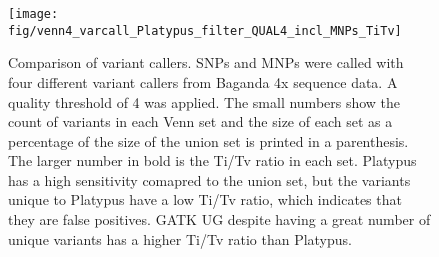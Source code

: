 \begin{figure}
\centering
\texttt{[image: fig/venn4\_varcall\_Platypus\_filter\_QUAL4\_incl\_MNPs\_TiTv]}
\caption{Comparison of variant callers. SNPs and MNPs were called with four different variant callers from Baganda 4x sequence data. A quality threshold of 4 was applied. The small numbers show the count of variants in each Venn set and the size of each set as a percentage of the size of the union set is printed in a parenthesis. The larger number in bold is the Ti/Tv ratio in each set. Platypus has a high sensitivity comapred to the union set, but the variants unique to Platypus have a low Ti/Tv ratio, which indicates that they are false positives. \gls{GATK} \gls{UG} despite having a great number of unique variants has a higher Ti/Tv ratio than Platypus.}
\label{fig:venn4_varcall_Platypus_filter_QUAL4_incl_MNPs_TiTv}
\end{figure}